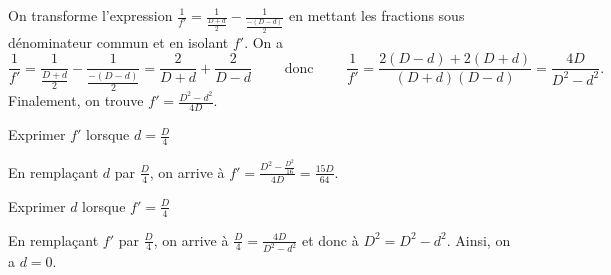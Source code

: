 
\begin{corrige}
On transforme l'expression $\frac{1}{f'}=\frac{1}{\frac{D+d}{2}}-\frac{1}{\frac{-(D-d)}{2}}$ en mettant les fractions sous dénominateur commun et en isolant $f'$. On a 
\[
\frac{1}{f'}=\frac{1}{\frac{D+d}{2}}-\frac{1}{\frac{-(D-d)}{2}}=\frac{2}{D+d}+\frac{2}{D-d}
\qquad\text{ donc }\qquad
\frac{1}{f'}=\frac{2(D-d)+2(D+d)}{(D+d)(D-d)}=\frac{4D}{D^2-d^2}.
\]
Finalement, on trouve  $f'=\frac{D^2-d^2}{4D}$.
\end{corrige}




\begin{enonce}
Exprimer $f'$ lorsque $d=\frac{D}{4}$
\end{enonce}


\begin{corrige}
En remplaçant $d$ par $\frac{D}{4}$, on arrive à  $f'=\frac{D^2-\frac{D^2}{16}}{4D}=\frac{15D}{64}$. 
\end{corrige}




\begin{enonce}
Exprimer $d$ lorsque $f'=\frac{D}{4}$
\end{enonce}


\begin{corrige}
En remplaçant $f'$ par $\frac{D}{4}$, on arrive à $\frac{D}{4}=\frac{4D}{D^2-d^2}$ et donc à $D^2=D^2-d^2$. Ainsi, on a $d=0$. 
\end{corrige}



\finEntrainement






\afficheReponsesMelangees

